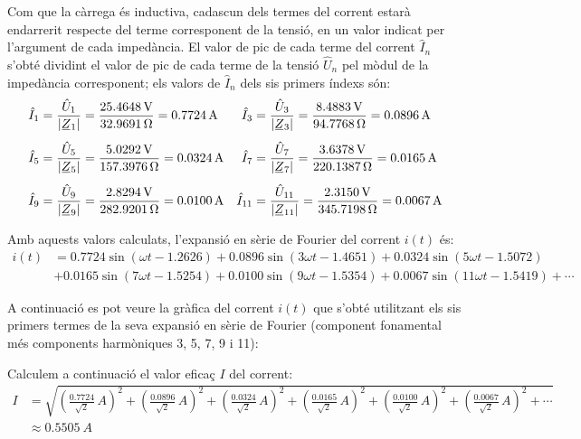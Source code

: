 \begin{exemple}
    Com que la càrrega és inductiva, cadascun dels
    termes del corrent estarà endarrerit respecte del terme corresponent
    de la tensió, en un valor indicat per l'argument de cada impedància.
    El valor de pic de cada terme del corrent $\hat{I}_n$ s'obté
    dividint el valor de pic de cada terme de la tensió $\hat{U}_n$ pel
    mòdul de la impedància corresponent; els valors de $\hat{I}_n$ dels sis primers índexs són:
    \begin{align*}
        \hat{I}_1 &= \frac{\hat{U}_1}{|\cmplx{Z}_1|} = \frac{\qty{25,4648}{V}}{\qty{32,9691}{\ohm}} = \qty{0,7724}{A}
        & \hat{I}_3 &= \frac{\hat{U}_3}{|\cmplx{Z}_3|} =\frac{\qty{8,4883}{V}}{\qty{94,7768}{\ohm}} = \qty{0,0896}{A}\\[1ex]
        \hat{I}_5 &= \frac{\hat{U}_5}{|\cmplx{Z}_5|} =\frac{\qty{5,0292}{V}}{\qty{157,3976}{\ohm}} =\qty{0,0324}{A}
        & \hat{I}_7 &= \frac{\hat{U}_7}{|\cmplx{Z}_7|} =\frac{\qty{3,6378}{V}}{\qty{220,1387}{\ohm}} =
        \qty{0,0165}{A}\\[1ex]
        \hat{I}_9 &= \frac{\hat{U}_9}{|\cmplx{Z}_9|} =\frac{\qty{2,8294}{V}}{\qty{282,9201}{\ohm}} =
        \qty{0,0100}{A} & \hat{I}_{11} &= \frac{\hat{U}_{11}}{|\cmplx{Z}_{11}|} =\frac{\qty{2,3150}{V}}
        {\qty{345,7198}{\ohm}} =  \qty{0,0067}{A}
    \end{align*}

    Amb aquests valors calculats, l'expansió en sèrie de Fourier del
    corrent $i(t)$ és:
    \[\begin{split}
         i(t) &=  \num{0,7724} \sin(\omega t - \num{1,2626}) +  \num{0,0896} \sin(3 \omega t -
         \num{1,4651}) + \num{0,0324} \sin(5 \omega t - \num{1,5072}) \\
         &+ \num{0,0165} \sin(7 \omega t - \num{1,5254}) + \num{0,0100} \sin(9 \omega t - \num{1,5354})
         + \num{0,0067} \sin(11 \omega t - \num{1,5419}) +\cdots
    \end{split}\]

    A continuació es pot veure la gràfica del corrent $i(t)$ que
    s'obté utilitzant els sis primers termes de la seva expansió en
    sèrie de Fourier (component fonamental més components harmòniques 3, 5, 7, 9 i 11):

    \begin{center}
      
    \end{center}

    Calculem a continuació el valor eficaç $I$ del corrent:
    \[\begin{split}
        I &= \sqrt{\left(\tfrac{\num{0,7724}}{\sqrt{2}}\unit{\,A}\right)^2 +
            \left(\tfrac{\num{0,0896}}{\sqrt{2}}\unit{\,A}\right)^2 +
            \left(\tfrac{\num{0,0324}}{\sqrt{2}}\unit{\,A}\right)^2 +
            \left(\tfrac{\num{0,0165}}{\sqrt{2}}\unit{\,A}\right)^2 +
            \left(\tfrac{\num{0,0100}}{\sqrt{2}}\unit{\,A}\right)^2 +
            \left(\tfrac{\num{0,0067}}{\sqrt{2}}\unit{\,A}\right)^2 + \cdots}
             \\[1ex]
            &\approx \qty{0,5505}{A}
    \end{split}\]


\end{exemple}
